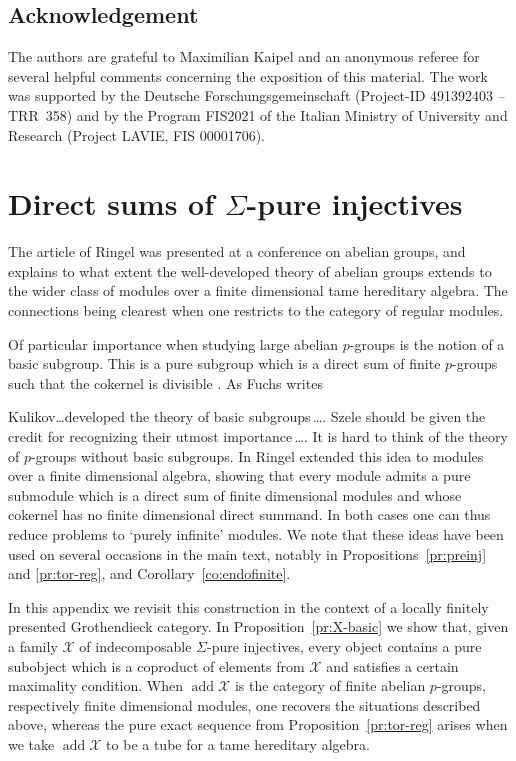 \documentclass[a4paper]{amsart}
\theoremstyle{plain}
\theoremstyle{definition}
\theoremstyle{remark}
\numberwithin{equation}{section}
\newcommand{\add}{\operatorname{add}}
\renewenvironment{quote}{%
  \list{}{%
    \leftmargin5ex   %
    \rightmargin\leftmargin
  }
  \item\relax
}
{\endlist}
\def\X{\mathcal X}
\begin{document}
\subsection*{Acknowledgement}
The authors are grateful to Maximilian Kaipel and an anonymous referee for
several helpful comments concerning the exposition of this material.
The work was supported by the Deutsche Forschungsgemeinschaft
(Project-ID 491392403 – TRR~358) and by the Program FIS2021 of the
Italian Ministry of University and Research (Project LAVIE, FIS
00001706).




\appendix

\section{Direct sums of \texorpdfstring{$\Sigma$}{Sigma}-pure injectives}

The article \cite{Ri1979} of Ringel was presented at a conference on abelian groups, and explains to what extent the well-developed theory of abelian groups extends to the wider class of modules over a finite dimensional tame hereditary algebra. The connections being clearest when one restricts to the category of regular modules.

Of particular importance when studying large abelian $p$-groups is the notion of a basic subgroup. This is a pure subgroup which is a direct sum of finite $p$-groups such that the cokernel is divisible \cite[Chapter 5.5]{Fu2015}. As Fuchs writes \cite[p.172]{Fu2015}
\begin{quote}
Kulikov\dots developed the theory of basic subgroups\,\dots. Szele should be given the credit for recognizing their utmost importance\,\dots. It is hard to think of the theory of $p$-groups without basic subgroups.
\end{quote}
In \cite[Theorem 1.G]{Ri1979} Ringel extended this idea to modules over a finite dimensional algebra, showing that every module admits a pure submodule which is a direct sum of finite dimensional modules and whose cokernel has no finite dimensional direct summand. In both cases one can thus reduce problems to `purely infinite' modules. We note that these ideas have been used on several occasions in the main text, notably in Propositions~\ref{pr:preinj} and \ref{pr:tor-reg}, and Corollary~\ref{co:endofinite}. 

In this appendix we revisit this construction in the context of a locally finitely presented Grothendieck category. In Proposition~\ref{pr:X-basic} we show that, given a family $\X$ of indecomposable $\Sigma$-pure injectives, every object contains a pure subobject which is  a coproduct of elements from $\X$ and satisfies a certain maximality condition. When $\add\X$ is the category of finite abelian $p$-groups, respectively finite dimensional modules, one recovers the situations described above, whereas the pure exact sequence from Proposition~\ref{pr:tor-reg} arises when we take $\add\X$ to be a tube for a tame hereditary algebra.
\end{document}
